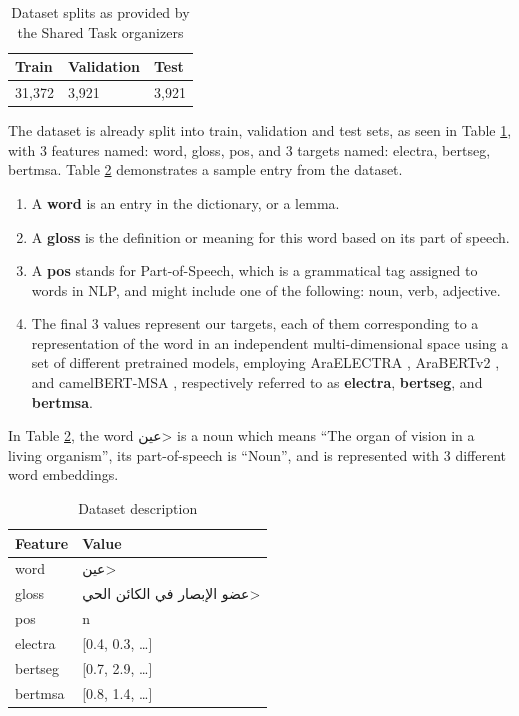 \documentclass[12pt]{article}
\begin{document}
\begin{table}[H]
    \centering
    \caption{Dataset splits as provided by the Shared Task organizers}
    \label{table:dataset-splits}
    \renewcommand{\arraystretch}{1.5}%
    \begin{tabularx}{\textwidth}{|X|X|X|}
        \hline
        \textbf{Train} & \textbf{Validation} & \textbf{Test} \\
        \hline
        31,372 & 3,921 & 3,921 \\
        \hline
    \end{tabularx}
\end{table}

The dataset is already split into train, validation and test sets, as seen in Table \ref{table:dataset-splits}, with 3 features named: word, gloss, pos, and 3 targets named: electra, bertseg, bertmsa. Table \ref{table:dataset-desc} demonstrates a sample entry from the dataset.

\begin{enumerate}
    \item A \textbf{word} is an entry in the dictionary, or a lemma.
    \item A \textbf{gloss} is the definition or meaning for this word based on its part of speech.
    \item A \textbf{pos} stands for Part-of-Speech, which is a grammatical tag assigned to words in NLP, and might include one of the following: noun, verb, adjective.
    \item The final 3 values represent our targets, each of them corresponding to a representation of the word in an independent multi-dimensional space using a set of different pretrained models, employing AraELECTRA \cite{Antoun2020-araELECTRA}, AraBERTv2 \cite{Antoun2020-araBERT}, and camelBERT-MSA \cite{inoue2021}, respectively referred to as \textbf{electra}, \textbf{bertseg}, and \textbf{bertmsa}.
\end{enumerate}

In Table \ref{table:dataset-desc}, the word \<عين> is a noun which means “The organ of vision in a living organism”, its part-of-speech is “Noun”, and is represented with 3 different word embeddings.

\begin{table}
    \centering
    \caption{Dataset description}
    \label{table:dataset-desc}
    \renewcommand{\arraystretch}{1.5}%
    \begin{tabularx}{\textwidth}{|l|X|}
        \hline
        \textbf{Feature} & \textbf{Value} \\
        \hline
        word & \<عين> \\
        \hline
        gloss & \<عضو الإبصار في الكائن الحي> \\
        \hline
        pos & n \\
        \hline
        electra & [0.4, 0.3, …] \\
        \hline
        bertseg & [0.7, 2.9, …] \\
        \hline
        bertmsa & [0.8, 1.4, …] \\
        \hline
    \end{tabularx}
\end{table}
\end{document}
